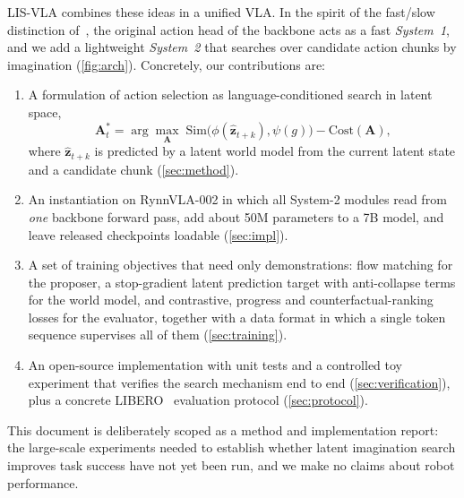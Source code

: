 \documentclass[11pt]{article}
\newcommand{\zhat}{\hat{\bm{z}}_{t+k}}
\newcommand{\A}{\mathbf{A}}
\begin{document}
LIS-VLA combines these ideas in a unified VLA. In the spirit of the fast/slow distinction of~\citet{kahneman2011thinking}, the original action head of the backbone acts as a fast \emph{System~1}, and we add a lightweight \emph{System~2} that searches over candidate action chunks by imagination (\cref{fig:arch}). Concretely, our contributions are:
\begin{enumerate}[leftmargin=*,itemsep=2pt]
  \item A formulation of action selection as language-conditioned search in latent space,
  \begin{equation*}
  \A^*_t = \arg\max_{\A}\; \mathrm{Sim}\big(\phi(\zhat),\psi(g)\big) - \mathrm{Cost}(\A),
  \end{equation*}
  where $\zhat$ is predicted by a latent world model from the current latent state and a candidate chunk (\cref{sec:method}).
  \item An instantiation on RynnVLA-002 in which all System-2 modules read from \emph{one} backbone forward pass, add about 50M parameters to a 7B model, and leave released checkpoints loadable (\cref{sec:impl}).
  \item A set of training objectives that need only demonstrations: flow matching for the proposer, a stop-gradient latent prediction target with anti-collapse terms for the world model, and contrastive, progress and counterfactual-ranking losses for the evaluator, together with a data format in which a single token sequence supervises all of them (\cref{sec:training}).
  \item An open-source implementation with unit tests and a controlled toy experiment that verifies the search mechanism end to end (\cref{sec:verification}), plus a concrete LIBERO~\citep{liu2023libero} evaluation protocol (\cref{sec:protocol}).
\end{enumerate}
This document is deliberately scoped as a method and implementation report: the large-scale experiments needed to establish whether latent imagination search improves task success have not yet been run, and we make no claims about robot performance.
\end{document}
